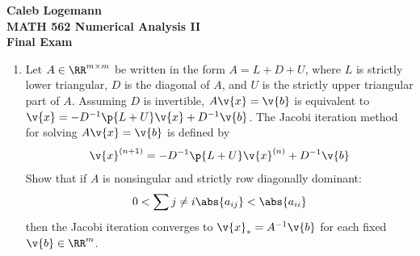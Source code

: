 \documentclass[11pt]{article}
\begin{document}
\noindent \textbf{\Large{Caleb Logemann \\
MATH 562 Numerical Analysis II \\
Final Exam
}}

%
\begin{enumerate}
    \item %
        Let $A \in \RR^{m \times m}$ be written in the form $A = L + D + U$,
        where $L$ is strictly lower triangular, $D$ is the diagonal of $A$, and $U$
        is the strictly upper triangular part of $A$.
        Assuming $D$ is invertible, $A\v{x} = \v{b}$ is equivalent to
        $\v{x} = -D^{-1}\p{L + U}\v{x} + D^{-1}\v{b}$.
        The Jacobi iteration method for solving $A\v{x} = \v{b}$ is defined by
        \[
            \v{x}^{(n+1)} = -D^{-1}\p{L + U}\v{x}^{(n)} + D^{-1}\v{b}
        \]
        Show that if $A$ is nonsingular and strictly row diagonally dominant:
        \[
            0 < \sum{j \neq i}{}{\abs{a_{ij}}} < \abs{a_{ii}}
        \]
        then the Jacobi iteration converges to $\v{x}_* = A^{-1}\v{b}$ for each
        fixed $\v{b} \in \RR^m$.


\end{enumerate}
\end{document}
